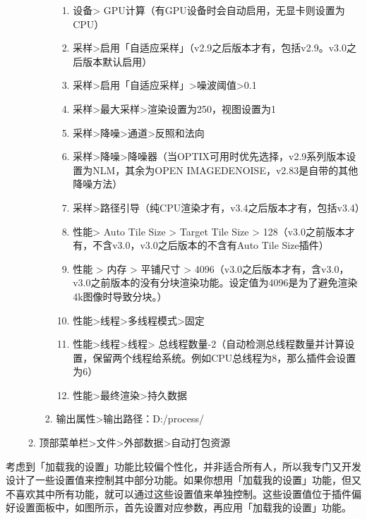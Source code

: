 \documentclass{../../public_resources/doc}
\begin{document}
\begin{enumerate}
\begin{enumerate}
\begin{enumerate}
\begin{enumerate}
                \item 设备> GPU计算（有GPU设备时会自动启用，无显卡则设置为CPU）
                \item 采样>启用「自适应采样」（v2.9之后版本才有，包括v2.9。v3.0之后版本默认启用）
                \item 采样>启用「自适应采样」>噪波阈值>0.1
                \item 采样>最大采样>渲染设置为250，视图设置为1
                \item 采样>降噪>通道>反照和法向
                \item 采样>降噪>降噪器（当OPTIX可用时优先选择，v2.9系列版本设置为NLM，其余为OPEN IMAGEDENOISE，v2.83是自带的其他降噪方法）
                \item 采样>路径引导（纯CPU渲染才有，v3.4之后版本才有，包括v3.4）
                \item 性能> Auto Tile Size > Target Tile Size > 128（v3.0之前版本才有，不含v3.0，v3.0之后版本的不含有Auto Tile Size插件）
                \item 性能 > 内存  > 平铺尺寸 > 4096（v3.0之后版本才有，含v3.0，v3.0之前版本的没有分块渲染功能。设定值为4096是为了避免渲染4k图像时导致分块。）
                \item 性能>线程>多线程模式>固定
                \item 性能>线程>线程> 总线程数量-2（自动检测总线程数量并计算设置，保留两个线程给系统。例如CPU总线程为8，那么插件会设置为6）
                \item 性能>最终渲染>持久数据
            \end{enumerate}
            \item 输出属性>输出路径：D:/process/
        \end{enumerate}
        \item 顶部菜单栏>文件>外部数据>自动打包资源
    \end{enumerate}
\end{enumerate}

考虑到「加载我的设置」功能比较偏个性化，并非适合所有人，所以我专门又开发设计了一些设置值来控制其中部分功能。如果你想用「加载我的设置」功能，但又不喜欢其中所有功能，就可以通过这些设置值来单独控制。这些设置值位于插件偏好设置面板中，如图所示，首先设置对应参数，再应用「加载我的设置」功能。
\end{document}
